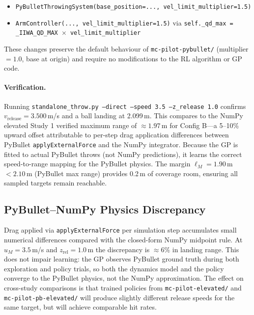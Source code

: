\begin{itemize}
  \item \texttt{PyBulletThrowingSystem(base\_position=...,\,vel\_limit\_multiplier=1.5)}
  \item \texttt{ArmController(...,\,vel\_limit\_multiplier=1.5)} via
        \texttt{self.\_qd\_max = \_IIWA\_QD\_MAX~$\times$~vel\_limit\_multiplier}
\end{itemize}

\noindent These changes preserve the default behaviour of \texttt{mc-pilot-pybullet/}
(multiplier $= 1.0$, base at origin) and require no modifications to the RL algorithm
or GP code.

\paragraph{Verification.}
Running \texttt{standalone\_throw.py --direct --speed 3.5 --z\_release 1.0} confirms
$v_{\mathrm{release}} = 3.500$\,m/s and a ball landing at 2.099\,m.
This compares to the NumPy elevated Study 1 verified maximum range of $\approx 1.97$\,m
for Config B---a 5--10\% upward offset attributable to per-step drag application
differences between PyBullet \texttt{applyExternalForce} and the NumPy integrator.
Because the GP is fitted to actual PyBullet throws (not NumPy predictions), it learns
the correct speed-to-range mapping for the PyBullet physics.
The margin $\ell_M = 1.90$\,m $< 2.10$\,m (PyBullet max range) provides 0.2\,m of
coverage room, ensuring all sampled targets remain reachable.

\subsection{PyBullet--NumPy Physics Discrepancy}
\label{sec:study3:discrepancy}

Drag applied via \texttt{applyExternalForce} per simulation step accumulates
small numerical differences compared with the closed-form NumPy midpoint rule.
At $u_M = 3.5$\,m/s and $z_{\mathrm{rel}} = 1.0$\,m the discrepancy is
$\approx 6\%$ in landing range.
This does not impair learning: the GP observes PyBullet ground truth during both
exploration and policy trials, so both the dynamics model and the policy converge
to the PyBullet physics, not the NumPy approximation.
The effect on cross-study comparisons is that trained policies from
\texttt{mc-pilot-elevated/} and \texttt{mc-pilot-pb-elevated/} will produce
slightly different release speeds for the same target, but will achieve comparable
hit rates.


